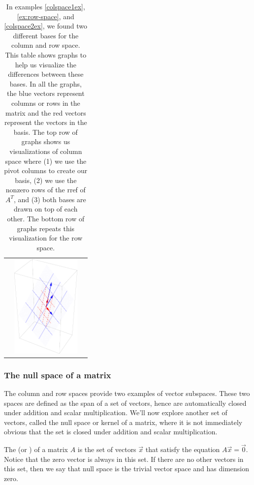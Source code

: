 \begin{table}
\begin{tabular}{ccc}
&\includegraphics[height=2in]{02-Applications/support/rowspace3}
\end{tabular}

\caption{\label{column and row space table} In examples \ref{colspace1ex}, \ref{ex:row-space}, and \ref{colspace2ex}, we found two different bases for the column and row space. This table shows graphs to help us visualize the differences between these bases.  In all the graphs, the blue vectors represent columns or rows in the matrix and the red vectors represent the vectors in the basis.  
The top row of graphs shows us visualizations of column space where (1) we use the pivot columns to create our basis, (2) we use the nonzero rows of the rref of $A^T$, and (3) both bases are drawn on top of each other.
The bottom row of graphs repeats this visualization for the row space.}
\end{table}

\subsubsection{The null space of a matrix}
The column and row spaces provide two examples of vector
subspaces. These two spaces are defined as the span of a set of
vectors, hence are automatically closed under addition and scalar
multiplication. We'll now explore another set of vectors, called the
null space or kernel of a matrix, where it is not immediately obvious that the set is closed under addition and scalar multiplication.

The  (or )
%
of a matrix $A$ is the set of vectors $\vec x$ that satisfy the equation $A\vec x=\vec 0$. Notice that the zero vector is always in this set. If there are no other vectors in this set, then we say that null space is the trivial vector space and has dimension zero.  

